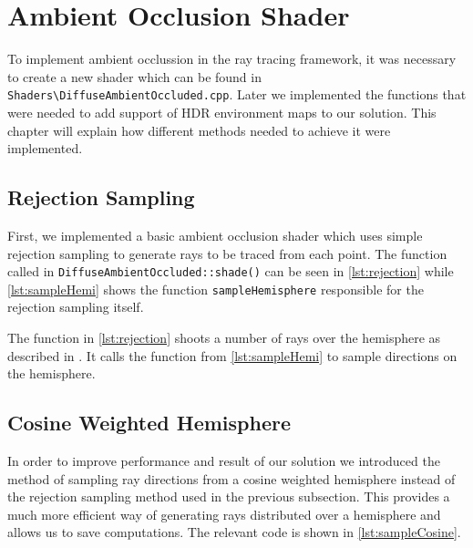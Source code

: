 \section{Ambient Occlusion Shader}
To implement ambient occlussion in the ray tracing framework, it was necessary to create a new shader which can be found in  \texttt{Shaders\textbackslash{}DiffuseAmbientOccluded.cpp}. Later we implemented the functions that were needed to add support of HDR environment maps to our solution. This chapter will explain how different  methods needed to achieve it were implemented.  

\subsection{Rejection Sampling}
\label{sec:rejection_sampling}

First, we implemented a basic ambient occlusion shader which uses simple rejection sampling to generate rays to be traced from each point. The function called in \texttt{DiffuseAmbientOccluded::shade()} can be seen in 	\autoref{lst:rejection} while \autoref{lst:sampleHemi} shows the function \texttt{sampleHemisphere} responsible for the rejection sampling itself.



The function in \autoref{lst:rejection} shoots a number of rays over the hemisphere as described in \cite{Gems17}. It calls the function from \autoref{lst:sampleHemi} to sample directions on the hemisphere.



\subsection{Cosine Weighted Hemisphere}
\label{sec:cosine_weighted}
In order to improve performance and result of our solution we introduced the method of sampling ray directions from a cosine weighted hemisphere instead of the rejection sampling method used in the previous subsection. This provides a much more efficient way of generating rays distributed over a hemisphere and allows us to save computations. The relevant code is shown in \autoref{lst:sampleCosine}.



